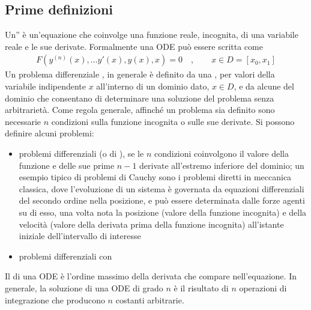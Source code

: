 \documentclass[letterpaper,10pt,italian]{jupyterBook}
\begin{document}
\subsection{Prime definizioni}
\label{\detokenize{ch/ode:prime-definizioni}}\label{\detokenize{ch/ode:ode-hs-def}}
\sphinxAtStartPar
Un” è un’equazione che coinvolge una funzione reale, incognita, di una variabile reale e le sue derivate. Formalmente una ODE può essere scritta come
\begin{equation*}
\begin{split}F\left(y^{(n)}(x), \dots y'(x), y(x), x \right) = 0 \quad , \qquad x \in D = [x_0, x_1]\end{split}
\end{equation*}
\sphinxAtStartPar
Un problema differenziale , in generale è definito da una , per valori della variabile indipendente \(x\) all’interno di un dominio dato, \(x \in D\), e da alcune  del dominio che consentano di determinare una soluzione del problema senza arbitrarietà. Come regola generale, affinché un problema sia definito sono necessarie \(n\) condizioni sulla funzione incognita o sulle sue derivate. Si possono definire alcuni problemi:
\begin{itemize}
\item {} 
\sphinxAtStartPar
problemi differenziali  (o di ), se le \(n\) condizioni coinvolgono il valore della funzione e delle sue prime \(n-1\) derivate all’estremo inferiore del dominio; un esempio tipico di problemi di Cauchy sono i problemi diretti in meccanica classica, dove l’evoluzione di un sistema è governata da equazioni differenziali del secondo ordine nella posizione, e può essere determinata dalle forze agenti su di esso, una volta nota la posizione (valore della funzione incognita) e della velocità (valore della derivata prima della funzione incognita) all’istante iniziale dell’intervallo di interesse

\item {} 
\sphinxAtStartPar
problemi differenziali con 

\end{itemize}

\sphinxAtStartPar
Il  di una ODE è l’ordine massimo della derivata che compare nell’equazione. In generale, la soluzione di una ODE di grado \(n\) è il risultato di \(n\) operazioni di integrazione che producono \(n\) costanti arbitrarie.
\end{document}
